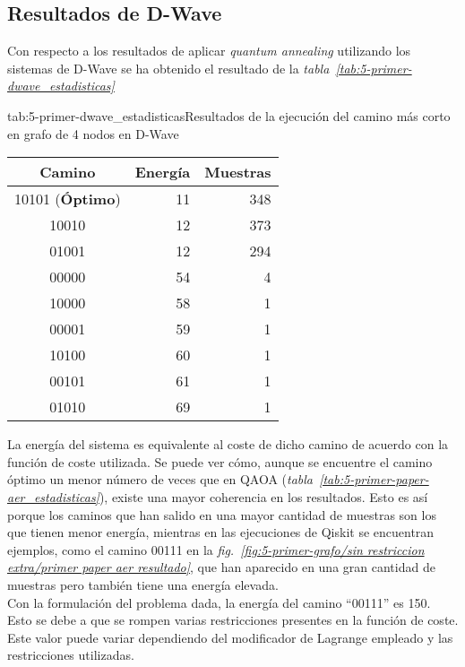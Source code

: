 \subsection{Resultados de D-Wave}

Con respecto a los resultados de aplicar \textit{quantum annealing} utilizando los sistemas de D-Wave se ha obtenido el resultado de la \textit{tabla~\ref{tab:5-primer-dwave_estadisticas}}

\begin{table}[Resultados D-Wave {--} artículo de Urgelles et al. (2022)]{tab:5-primer-dwave_estadisticas}{Resultados de la ejecución del camino más corto en grafo de 4 nodos en D-Wave}
  \centering
  \begin{tabular}{|c|r|r|}
    \hline
    \textbf{Camino}         & \textbf{Energía} & \textbf{Muestras} \\ \hline
    10101 (\textbf{Óptimo}) & 11               & 348               \\ \hline
    10010                   & 12               & 373               \\ \hline
    01001                   & 12               & 294               \\ \hline
    00000                   & 54               &   4               \\ \hline
    10000                   & 58               &   1               \\ \hline
    00001                   & 59               &   1               \\ \hline
    10100                   & 60               &   1               \\ \hline
    00101                   & 61               &   1               \\ \hline
    01010                   & 69               &   1               \\ \hline
  \end{tabular}
\end{table}

La energía del sistema es equivalente al coste de dicho camino de acuerdo con la función de coste utilizada.
Se puede ver cómo, aunque se encuentre el camino óptimo un menor número de veces que en QAOA (\textit{tabla~\ref{tab:5-primer-paper-aer_estadisticas}}), existe una mayor coherencia en los resultados.
Esto es así porque los caminos que han salido en una mayor cantidad de muestras son los que tienen menor energía, mientras en las ejecuciones de Qiskit se encuentran ejemplos, como el camino 00111 en la
\textit{fig.~\ref{fig:5-primer-grafo/sin restriccion extra/primer paper aer resultado}}, que han aparecido en una gran cantidad de muestras pero también tiene una energía elevada.
\\
Con la formulación del problema dada, la energía del camino ``00111'' es 150.
Esto se debe a que se rompen varias restricciones presentes en la función de coste.
Este valor puede variar dependiendo del modificador de Lagrange empleado y las restricciones utilizadas.

